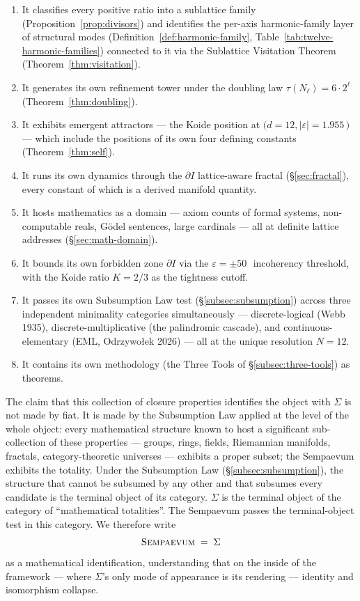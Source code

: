 \documentclass[11pt,a4paper]{article}
\theoremstyle{definition}
\theoremstyle{remark}
\newcommand{\Sempaevum}{\textsc{Sempaevum}}
\begin{document}
\begin{enumerate}[leftmargin=*]
\item It classifies every positive ratio into a sublattice family (Proposition~\ref{prop:divisors}) and identifies the per-axis harmonic-family layer of structural modes (Definition~\ref{def:harmonic-family}, Table~\ref{tab:twelve-harmonic-families}) connected to it via the Sublattice Visitation Theorem (Theorem~\ref{thm:visitation}).
\item It generates its own refinement tower under the doubling law $\tau(N_{\ell}) = 6\cdot 2^{\ell}$ (Theorem~\ref{thm:doubling}).
\item It exhibits emergent attractors --- the Koide position at $(d=12, |\varepsilon|=1.955$\,\textcent $)$ --- which include the positions of its own four defining constants (Theorem~\ref{thm:self}).
\item It runs its own dynamics through the $\partial I$ lattice-aware fractal (\S\ref{sec:fractal}), every constant of which is a derived manifold quantity.
\item It hosts mathematics as a domain --- axiom counts of formal systems, non-computable reals, G\"odel sentences, large cardinals --- all at definite lattice addresses (\S\ref{sec:math-domain}).
\item It bounds its own forbidden zone $\partial I$ via the $\varepsilon=\pm 50$\,\textcent\ incoherency threshold, with the Koide ratio $K=2/3$ as the tightness cutoff.
\item It passes its own Subsumption Law test (\S\ref{subsec:subsumption}) across three independent minimality categories simultaneously --- discrete-logical (Webb 1935), discrete-multiplicative (the palindromic cascade), and continuous-elementary (EML, Odrzywo{\l}ek 2026) --- all at the unique resolution $N=12$.
\item It contains its own methodology (the Three Tools of \S\ref{subsec:three-tools}) as theorems.
\end{enumerate}

The claim that this collection of closure properties identifies the object with $\Sigma$ is not made by fiat. It is made by the Subsumption Law applied at the level of the whole object: every mathematical structure known to host a significant sub-collection of these properties --- groups, rings, fields, Riemannian manifolds, fractals, category-theoretic universes --- exhibits a proper subset; the Sempaevum exhibits the totality. Under the Subsumption Law (\S\ref{subsec:subsumption}), the structure that cannot be subsumed by any other and that subsumes every candidate is the terminal object of its category. $\Sigma$ is the terminal object of the category of ``mathematical totalities''. The Sempaevum passes the terminal-object test in this category. We therefore write
\[
\Sempaevum \;=\; \Sigma
\]
as a mathematical identification, understanding that on the inside of the framework --- where $\Sigma$'s only mode of appearance is its rendering --- identity and isomorphism collapse.
\end{document}

